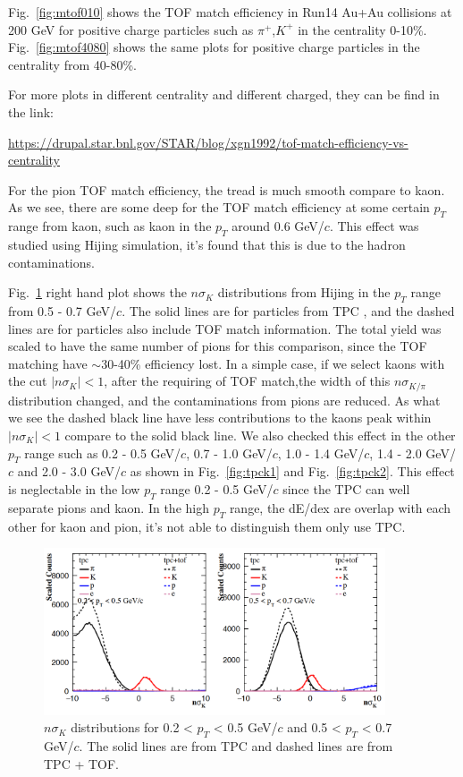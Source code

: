 Fig.~\ref{fig:mtof010} shows the TOF match efficiency in Run14 Au+Au collisions at 200 GeV for positive charge particles such as $\pi^{+}$,$K^{+}$ in the centrality 0-10\%. Fig.~\ref{fig:mtof4080} shows the same plots for positive charge particles in the centrality from 40-80\%.

For more plots in different centrality and different charged, they can be find in the link:

\url{https://drupal.star.bnl.gov/STAR/blog/xgn1992/tof-match-efficiency-vs-centrality}

For the pion TOF match efficiency, the tread is much smooth compare to kaon. As we see, there are some deep for the TOF match efficiency at some certain $p_{T}$ range from kaon, such as kaon in the $p_{T}$ around 0.6 GeV/$c$. This effect was studied using Hijing simulation, it's found that this is due to the hadron contaminations. 

Fig.~\ref{fig:tpck0} right hand plot shows the $n\sigma_{K}$ distributions from Hijing in the $p_{T}$ range from 0.5 - 0.7 GeV/$c$. The solid lines are for particles from TPC , and the dashed lines are for particles also include TOF match information. The total yield was scaled to have the same number of pions for this comparison, since the TOF matching have $\sim$30-40\% efficiency lost. In a simple case, if we select kaons with the cut $|n\sigma_{K}| < 1 $, after the requiring of TOF match,the width of this $n\sigma_{K/\pi}$ distribution changed, and the contaminations from pions are reduced. As what we see the dashed black line have less contributions to the kaons peak within $|n\sigma_{K}| < 1$ compare to the solid black line. We also checked this effect in the other $p_{T}$ range such as 0.2 - 0.5 GeV/$c$, 0.7 - 1.0 GeV/$c$, 1.0 - 1.4 GeV/$c$, 1.4 - 2.0 GeV/$c$ and 2.0 - 3.0 GeV/$c$ as shown in Fig.~\ref{fig:tpck1} and Fig.~\ref{fig:tpck2}. This effect is neglectable in the low $p_{T}$ range 0.2 - 0.5 GeV/$c$ since the TPC can well separate pions and kaon. In the high $p_{T}$ range, the dE/dex are overlap with each other for kaon and pion, it's not able to distinguish them only use TPC.

\begin{figure}[htbp]
\centering
\includegraphics[keepaspectratio,width=0.9\textwidth,angle=-0]{figure/Run14_D0HFT/tofMatch_Hijing_nSigmaK_new_0.png}
\caption{$n\sigma_{K}$ distributions for 0.2 < $p_T$ < 0.5 GeV/$c$ and 0.5 < $p_T$ < 0.7 GeV/$c$. The solid lines are from TPC and dashed lines are from TPC + TOF.}
\label{fig:tpck0}
\end{figure}

